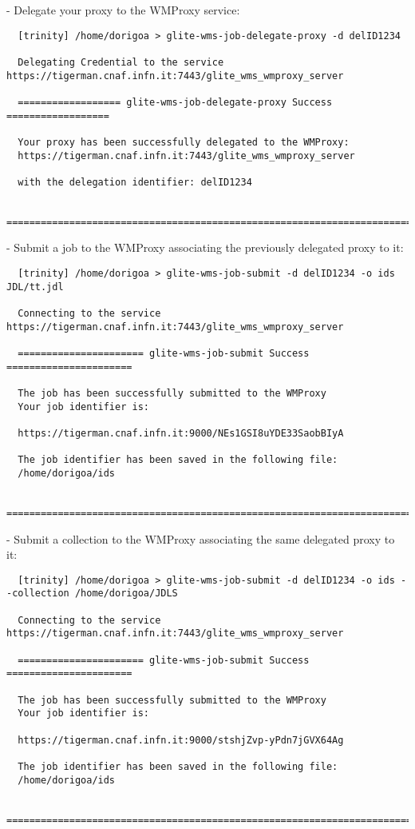 - Delegate your proxy to the WMProxy service:
\begin{scriptsize}
\begin{verbatim}
  [trinity] /home/dorigoa > glite-wms-job-delegate-proxy -d delID1234

  Delegating Credential to the service https://tigerman.cnaf.infn.it:7443/glite_wms_wmproxy_server

  ================== glite-wms-job-delegate-proxy Success ==================

  Your proxy has been successfully delegated to the WMProxy:
  https://tigerman.cnaf.infn.it:7443/glite_wms_wmproxy_server

  with the delegation identifier: delID1234

  ========================================================================== 
\end{verbatim}
\end{scriptsize}

- Submit a job to the WMProxy associating the previously delegated proxy to it:
\begin{scriptsize}
\begin{verbatim}
  [trinity] /home/dorigoa > glite-wms-job-submit -d delID1234 -o ids JDL/tt.jdl 

  Connecting to the service https://tigerman.cnaf.infn.it:7443/glite_wms_wmproxy_server

  ====================== glite-wms-job-submit Success ======================

  The job has been successfully submitted to the WMProxy
  Your job identifier is:

  https://tigerman.cnaf.infn.it:9000/NEs1GSI8uYDE33SaobBIyA

  The job identifier has been saved in the following file:
  /home/dorigoa/ids

  ==========================================================================
\end{verbatim}
\end{scriptsize}

- Submit a collection to the WMProxy associating the same delegated proxy to it:
\begin{scriptsize}
\begin{verbatim}
  [trinity] /home/dorigoa > glite-wms-job-submit -d delID1234 -o ids --collection /home/dorigoa/JDLS

  Connecting to the service https://tigerman.cnaf.infn.it:7443/glite_wms_wmproxy_server

  ====================== glite-wms-job-submit Success ======================

  The job has been successfully submitted to the WMProxy
  Your job identifier is:

  https://tigerman.cnaf.infn.it:9000/stshjZvp-yPdn7jGVX64Ag

  The job identifier has been saved in the following file:
  /home/dorigoa/ids

  ==========================================================================
\end{verbatim}
\end{scriptsize}

